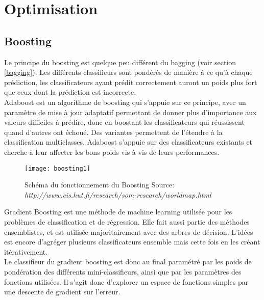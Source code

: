 
\newpage
\section{Optimisation}

\subsection{Boosting}
Le principe du boosting est quelque peu différent du bagging (voir section \ref{bagging}). Les différents classifieurs sont pondérés de manière à ce qu’à chaque prédiction, les classificateurs ayant prédit correctement auront un poids plus fort que ceux dont la prédiction est incorrecte.\\


Adaboost est un algorithme de boosting qui s’appuie sur ce principe, avec un paramètre de mise à jour adaptatif permettant de donner plus d’importance aux valeurs difficiles à prédire, donc en boostant les classificateurs qui réussissent quand d’autres ont échoué. Des variantes permettent de l’étendre à la classification multiclasses. Adaboost s’appuie sur des classificateurs existants et cherche à leur affecter les bons poids vis à vis de leurs performances\cite{EnsembleMethods}.\\


\begin{figure}[H]
	\texttt{[image: boosting1]}
	\caption{\label{BoostingSchema}Schéma du fonctionnement du Boosting \newline Source: \textit{http://www.cis.hut.fi/research/som-research/worldmap.html}}
\end{figure}

Gradient Boosting est une méthode de machine learning utilisée pour les problèmes de classification et de régression. Elle fait aussi partie des méthodes ensemblistes, et est utilisée majoritairement avec des arbres de décision. L'idées est encore d'agréger plusieurs classificateurs ensemble mais cette fois en les créant itérativement.\\


Le classifieur du gradient boosting est donc au final paramétré par les poids de pondération des différents mini-classifieurs, ainsi que par les paramètres des fonctions utilisées. Il s’agit donc d’explorer un espace de fonctions simples par une descente de gradient sur l’erreur\cite{EnsembleMethods}.


